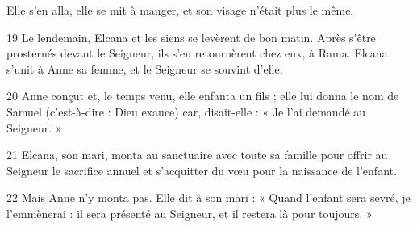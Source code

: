 Elle s’en alla, elle se mit à manger, et son visage n’était plus le même.

19 Le lendemain, Elcana et les siens se levèrent de bon matin. Après s’être prosternés devant le Seigneur, ils s’en retournèrent chez eux, à Rama. Elcana s’unit à Anne sa femme, et le Seigneur se souvint d’elle.

20 Anne conçut et, le temps venu, elle enfanta un fils ; elle lui donna le nom de Samuel (c’est-à-dire : Dieu exauce) car, disait-elle : « Je l’ai demandé au Seigneur. »

21 Elcana, son mari, monta au sanctuaire avec toute sa famille pour offrir au Seigneur le sacrifice annuel et s’acquitter du vœu pour la naissance de l’enfant.

22 Mais Anne n’y monta pas. Elle dit à son mari : « Quand l’enfant sera sevré, je l’emmènerai : il sera présenté au Seigneur, et il restera là pour toujours. »
